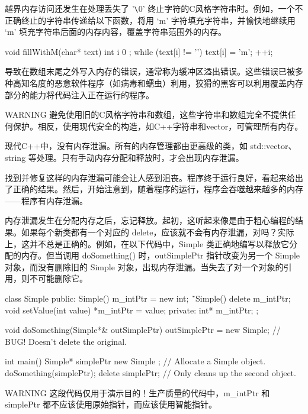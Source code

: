 越界内存访问还发生在处理丢失了 '\verb|\|0' 终止字符的C风格字符串时。例如，一个不正确终止的字符串传递给以下函数，将用 ‘m’ 字符填充字符串，并愉快地继续用 ‘m’ 填充字符串后面的内存内容，覆盖字符串范围外的内存。

\begin{cpp}
void fillWithM(char* text)
{
    int i { 0 };
    while (text[i] != '\0') {
        text[i] = 'm';
        ++i;
    }
}
\end{cpp}

导致在数组末尾之外写入内存的错误，通常称为缓冲区溢出错误。这些错误已被多种高知名度的恶意软件程序（如病毒和蠕虫）利用，狡猾的黑客可以利用覆盖内存部分的能力将代码注入正在运行的程序。

\begin{myWarning}{WARNING}
避免使用旧的C风格字符串和数组，这些字符串和数组完全不提供任何保护。相反，使用现代安全的构造，如C++字符串和vector，可管理所有内存。
\end{myWarning}


现代C++中，没有内存泄漏。所有的内存管理都由更高级的类，如 std::vector、string 等处理。只有手动内存分配和释放时，才会出现内存泄漏。

找到并修复这样的内存泄漏可能会让人感到沮丧。程序终于运行良好，看起来给出了正确的结果。然后，开始注意到，随着程序的运行，程序会吞噬越来越多的内存——程序有内存泄漏。

内存泄漏发生在分配内存之后，忘记释放。起初，这听起来像是由于粗心编程的结果。如果每个新类都有一个对应的 delete，应该就不会有内存泄漏，对吗？实际上，这并不总是正确的。例如，在以下代码中，Simple 类正确地编写以释放它分配的内存。但当调用 doSomething() 时，outSimplePtr 指针改变为另一个 Simple 对象，而没有删除旧的 Simple 对象，出现内存泄漏。当失去了对一个对象的引用，则不可能删除它。

\begin{cpp}
class Simple
{
    public:
    Simple() { m_intPtr = new int{}; }
    ˜Simple() { delete m_intPtr; }
    void setValue(int value) { *m_intPtr = value; }
    private:
    int* m_intPtr;
};

void doSomething(Simple*& outSimplePtr)
{
    outSimplePtr = new Simple{}; // BUG! Doesn't delete the original.
}

int main()
{
    Simple* simplePtr { new Simple{} }; // Allocate a Simple object.
    doSomething(simplePtr);
    delete simplePtr; // Only cleans up the second object.
}
\end{cpp}

\begin{myWarning}{WARNING}
这段代码仅用于演示目的！生产质量的代码中，m\_intPtr 和 simplePtr 都不应该使用原始指针，而应该使用智能指针。
\end{myWarning}

